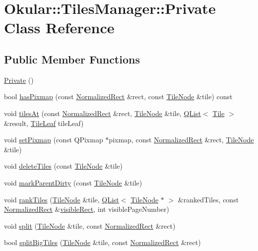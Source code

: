 \hypertarget{classTilesManager_1_1Private}{\section{Okular\+:\+:Tiles\+Manager\+:\+:Private Class Reference}
\label{classTilesManager_1_1Private}
}
\subsection*{Public Member Functions}
\begin{DoxyCompactItemize}
\item 
\hyperlink{classTilesManager_1_1Private_a5633da74112a68e097dde8b0d11f56e4}{Private} ()
\item 
bool \hyperlink{classTilesManager_1_1Private_ab246bf1b76ee9f16c756991c4d599249}{has\+Pixmap} (const \hyperlink{classOkular_1_1NormalizedRect}{Normalized\+Rect} \&rect, const \hyperlink{classOkular_1_1TileNode}{Tile\+Node} \&tile) const 
\item 
void \hyperlink{classTilesManager_1_1Private_a376b491f94a16015e7a1b019bb9c1165}{tiles\+At} (const \hyperlink{classOkular_1_1NormalizedRect}{Normalized\+Rect} \&rect, \hyperlink{classOkular_1_1TileNode}{Tile\+Node} \&tile, \hyperlink{classQList}{Q\+List}$<$ \hyperlink{classOkular_1_1Tile}{Tile} $>$ \&result, \hyperlink{classOkular_1_1TilesManager_a89f92ae8fdfb530b5625343876f63e29}{Tile\+Leaf} tile\+Leaf)
\item 
void \hyperlink{classTilesManager_1_1Private_a95b185ba208c1492a7c98f9d415c667e}{set\+Pixmap} (const Q\+Pixmap $\ast$pixmap, const \hyperlink{classOkular_1_1NormalizedRect}{Normalized\+Rect} \&rect, \hyperlink{classOkular_1_1TileNode}{Tile\+Node} \&tile)
\item 
void \hyperlink{classTilesManager_1_1Private_aa036608dc89f16f1ba59b21636925c3c}{delete\+Tiles} (const \hyperlink{classOkular_1_1TileNode}{Tile\+Node} \&tile)
\item 
void \hyperlink{classTilesManager_1_1Private_ab136a24cf52476c37c0b285f22a04b5a}{mark\+Parent\+Dirty} (const \hyperlink{classOkular_1_1TileNode}{Tile\+Node} \&tile)
\item 
void \hyperlink{classTilesManager_1_1Private_a314df09ffe4598e871cd05e7ee098e06}{rank\+Tiles} (\hyperlink{classOkular_1_1TileNode}{Tile\+Node} \&tile, \hyperlink{classQList}{Q\+List}$<$ \hyperlink{classOkular_1_1TileNode}{Tile\+Node} $\ast$ $>$ \&ranked\+Tiles, const \hyperlink{classOkular_1_1NormalizedRect}{Normalized\+Rect} \&\hyperlink{classTilesManager_1_1Private_abc6e4b8356815117fa81618fb4a1e714}{visible\+Rect}, int visible\+Page\+Number)
\item 
void \hyperlink{classTilesManager_1_1Private_adf5cb50321f42cbf36c8691bc6dab7b5}{split} (\hyperlink{classOkular_1_1TileNode}{Tile\+Node} \&tile, const \hyperlink{classOkular_1_1NormalizedRect}{Normalized\+Rect} \&rect)
\item 
bool \hyperlink{classTilesManager_1_1Private_aa64eea239e0ef5af4bf0e9522dfe57a5}{split\+Big\+Tiles} (\hyperlink{classOkular_1_1TileNode}{Tile\+Node} \&tile, const \hyperlink{classOkular_1_1NormalizedRect}{Normalized\+Rect} \&rect)
\end{DoxyCompactItemize}
